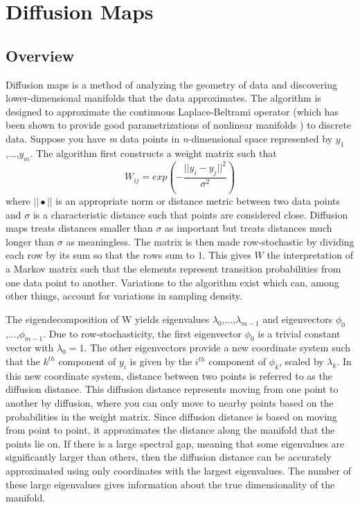 \documentclass[12pt]{article}
\begin{document}
\section{Diffusion Maps}

\subsection{Overview} \label{DMO}

Diffusion maps is a method of analyzing the geometry of data and discovering lower-dimensional manifolds that the data approximates. The algorithm is designed to approximate the continuous Laplace-Beltrami operator (which has been shown to provide good parametrizations of nonlinear manifolds \cite{Jones2008}) to discrete data. Suppose you have \textit{m} data points in \textit{n}-dimensional space represented by $y_1$,...,$y_\textit{m}$. The algorithm first constructs a weight matrix such that\\
\[
W_{ij}=exp(-\frac{||y_i-y_j||^2}{\sigma ^2})
\]
where $|| \bullet ||$ is an appropriate norm or distance metric between two data points and $\sigma$ is a characteristic distance such that points are considered close. Diffusion maps treats distances smaller than $\sigma$ as important but treats distances much longer than $\sigma$ as meaningless. The matrix is then made row-stochastic by dividing each row by its sum so that the rows sum to $1$. This gives $W$ the interpretation of a Markov matrix such that the elements represent transition probabilities from one data point to another. Variations to the algorithm exist which can, among other things, account for variations in sampling density.\vspace{1mm}

The eigendecomposition of W yields eigenvalues $\lambda _0$,...,$\lambda_{m-1}$ and eigenvectors $\phi _0$,...,$\phi_{m-1}$. Due to row-stochasticity, the first eigenvector $\phi_0$ is a trivial constant vector with $\lambda_0 = 1$. The other eigenvectors provide a new coordinate system such that the $k^{th}$ component of $y_i$ is given by the $i^{th}$ component of $\phi_k$, scaled by $\lambda_k$. In this new coordinate system, distance between two points is referred to as the diffusion distance. This diffusion distance represents moving from one point to another by diffusion, where you can only move to nearby points based on the probabilities in the weight matrix. Since diffusion distance is based on moving from point to point, it approximates the distance along the manifold that the points lie on. If there is a large spectral gap, meaning that some eigenvalues are significantly larger than others, then the diffusion distance can be accurately approximated using only coordinates with the largest eigenvalues.  The number of these large eigenvalues gives information about the true dimensionality of the manifold.
\end{document}
